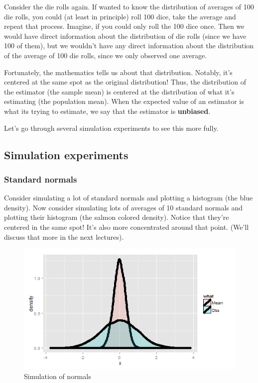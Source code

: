 \documentclass[]{article}
\begin{document}
Consider the die rolls again. If wanted to know the distribution of
averages of 100 die rolls, you could (at least in principle) roll 100
dice, take the average and repeat that process. Imagine, if you could
only roll the 100 dice once. Then we would have direct information about
the distribution of die rolls (since we have 100 of them), but we
wouldn't have any direct information about the distribution of the
average of 100 die rolls, since we only observed one average.

Fortunately, the mathematics tells us about that distribution. Notably,
it's centered at the same spot as the original distribution! Thus, the
distribution of the estimator (the sample mean) is centered at the
distribution of what it's estimating (the population mean). When the
expected value of an estimator is what its trying to estimate, we say
that the estimator is \textbf{unbiased}.

Let's go through several simulation experiments to see this more fully.

\subsection{Simulation experiments}\label{simulation-experiments}

\subsubsection{Standard normals}\label{standard-normals}

Consider simulating a lot of standard normals and plotting a histogram
(the blue density). Now consider simulating lots of averages of 10
standard normals and plotting their histogram (the salmon colored
density). Notice that they're centered in the same spot! It's also more
concentrated around that point. (We'll discuss that more in the next
lectures).

\begin{figure}[htbp]
\centering
\includegraphics{LeanPub/images/normalSimulationMean-1.png}
\caption{Simulation of normals}
\end{figure}
\end{document}
